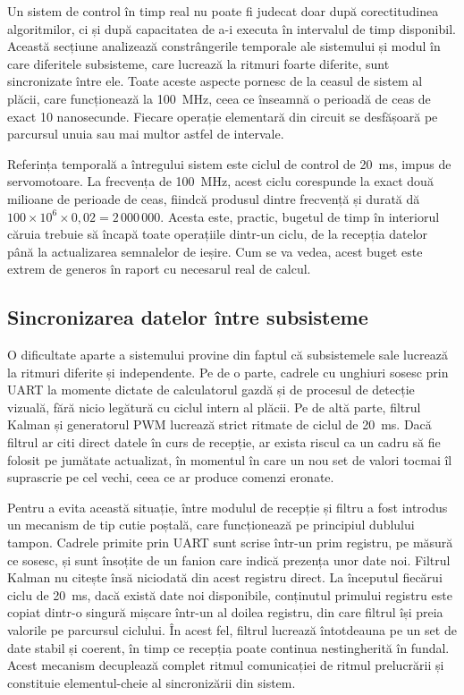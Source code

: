 Un sistem de control în timp real nu poate fi judecat doar după corectitudinea
algoritmilor, ci și după capacitatea de a-i executa în intervalul de timp
disponibil. Această secțiune analizează constrângerile temporale ale sistemului și
modul în care diferitele subsisteme, care lucrează la ritmuri foarte diferite, sunt
sincronizate între ele. Toate aceste aspecte pornesc de la ceasul de sistem al
plăcii, care funcționează la 100~MHz, ceea ce înseamnă o perioadă de ceas de exact
10 nanosecunde. Fiecare operație elementară din circuit se desfășoară pe parcursul
unuia sau mai multor astfel de intervale.

Referința temporală a întregului sistem este ciclul de control de 20~ms, impus de
servomotoare. La frecvența de 100~MHz, acest ciclu corespunde la exact două
milioane de perioade de ceas, fiindcă produsul dintre frecvență și durată dă
$100 \times 10^6 \times 0{,}02 = 2\,000\,000$. Acesta este, practic, bugetul de
timp în interiorul căruia trebuie să încapă toate operațiile dintr-un ciclu, de la
recepția datelor până la actualizarea semnalelor de ieșire. Cum se va vedea, acest
buget este extrem de generos în raport cu necesarul real de calcul.

\subsection{Sincronizarea datelor între subsisteme}

O dificultate aparte a sistemului provine din faptul că subsistemele sale lucrează
la ritmuri diferite și independente. Pe de o parte, cadrele cu unghiuri sosesc prin
UART la momente dictate de calculatorul gazdă și de procesul de detecție vizuală,
fără nicio legătură cu ciclul intern al plăcii. Pe de altă parte, filtrul Kalman și
generatorul PWM lucrează strict ritmate de ciclul de 20~ms. Dacă filtrul ar citi
direct datele în curs de recepție, ar exista riscul ca un cadru să fie folosit pe
jumătate actualizat, în momentul în care un nou set de valori tocmai îl
suprascrie pe cel vechi, ceea ce ar produce comenzi eronate.

Pentru a evita această situație, între modulul de recepție și filtru a fost
introdus un mecanism de tip cutie poștală, care funcționează pe principiul dublului
tampon. Cadrele primite prin UART sunt scrise într-un prim registru, pe măsură ce
sosesc, și sunt însoțite de un fanion care indică prezența unor date noi.
Filtrul Kalman nu citește însă niciodată din acest registru direct. La începutul
fiecărui ciclu de 20~ms, dacă există date noi disponibile, conținutul primului
registru este copiat dintr-o singură mișcare într-un al doilea registru, din care
filtrul își preia valorile pe parcursul ciclului. În acest fel, filtrul lucrează
întotdeauna pe un set de date stabil și coerent, în timp ce recepția poate continua
nestingherită în fundal. Acest mecanism decuplează complet ritmul comunicației de
ritmul prelucrării și constituie elementul-cheie al sincronizării din sistem.

